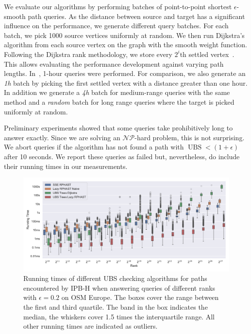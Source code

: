 \documentclass[a4paper,UKenglish,cleveref, autoref, thm-restate]{lipics-v2021}
\newcommand*{\ubs}{\operatorname{UBS}}
\begin{document}
We evaluate our algorithms by performing batches of point-to-point shortest $\epsilon$-smooth path queries.
As the distance between source and target has a significant influence on the performance, we generate different query batches.
For each batch, we pick 1000 source vertices uniformly at random.
We then run Dijkstra's algorithm from each source vertex on the graph with the smooth weight function.
Following the Dijkstra rank methodology, we store every $2^i$th settled vertex~\cite{ss-hhhes-05}.
This allows evaluating the performance development against varying path lengths.
In~\cite{adgw-arrn-13}, 1-hour queries were performed.
For comparison, we also generate an \emph{1h} batch by picking the first settled vertex with a distance greater than one hour.
In addition we generate a \emph{4h} batch for medium-range queries with the same method and a \emph{random} batch for long range queries where the target is picked uniformly at random.

Preliminary experiments showed that some queries take prohibitively long to answer exactly.
Since we are solving an $\mathcal{NP}$-hard problem, this is not surprising.
We abort queries if the algorithm has not found a path with $\ubs < (1+\epsilon)$ after 10 seconds.
We report these queries as failed but, nevertheless, do include their running times in our measurements.

\begin{figure}
\centering
\includegraphics[width=\linewidth]{fig/ubs_perf.pdf}
\caption{
Running times of different UBS checking algorithms for paths encountered by IPB-H when answering queries of different ranks with $\epsilon = 0.2$ on OSM Europe.
The boxes cover the range between the first and third quartile.
The band in the box indicates the median, the whiskers cover 1.5 times the interquartile range.
All other running times are indicated as outliers.
}\label{fig:ubs_perf}
\end{figure}
\end{document}
